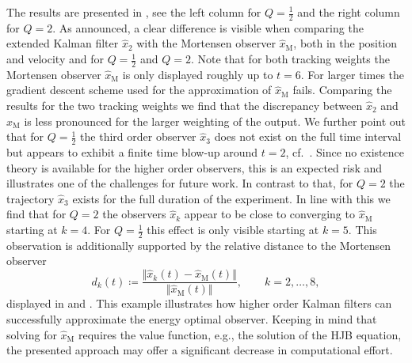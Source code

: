 \documentclass[11pt,reqno]{amsart}
\numberwithin{equation}{section}
\theoremstyle{plain}
\begin{document}
The results are presented in , see the left column for $Q = \tfrac{1}{2}$ and the right column for $Q = 2$. As announced, a clear difference is visible when comparing the extended Kalman filter $\widehat{x}_2$ with the Mortensen observer $\widehat{x}_\mathrm{M}$, both in the position and velocity and for $Q = \tfrac{1}{2} $ and $Q = 2 $. Note that for both tracking weights the Mortensen observer $\widehat{x}_\mathrm{M}$ is only displayed roughly up to $t = 6$. For larger times the gradient descent scheme used for the approximation of $\widehat{x}_\mathrm{M}$ fails. Comparing the results for the two tracking weights we find that the discrepancy between $\widehat{x}_2$ and $\widehat{x}_\mathrm{M}$ is less pronounced for the larger weighting of the output. 
We further point out that for $Q = \tfrac{1}{2} $ the third order observer $\widehat{x}_3$ does not exist on the full time interval but appears to exhibit a finite time blow-up around $t = 2$, cf.~. Since no existence theory is available for the higher order observers, this is an expected risk and illustrates one of the challenges for future work. In contrast to that, for $Q = 2$ the trajectory $\widehat{x}_3$ exists for the full duration of the experiment.
In line with this we find that for $Q=2 $ the observers $\widehat{x}_k$ appear to be close to converging to $\widehat{x}_\mathrm{M}$ starting at $k = 4$. For $Q = \tfrac{1}{2}$ this effect is only visible starting at $k = 5$. This observation is additionally supported by the relative distance to the Mortensen observer
%
\begin{equation*}
    d_k(t) \coloneqq \frac{\Vert \widehat{x}_k(t) - \widehat{x}_\mathrm{M}(t) \Vert}{\Vert \widehat{x}_\mathrm{M}(t) \Vert},
    \qquad k = 2,\dots,8,
\end{equation*}
%
displayed in  and .
This example illustrates how higher order Kalman filters can successfully approximate the energy optimal observer. Keeping in mind that solving for $\widehat{x}_{\mathrm{M}}$ requires the value function, e.g., the solution of the HJB equation, the presented approach may offer a significant decrease in computational effort. 
\end{document}
